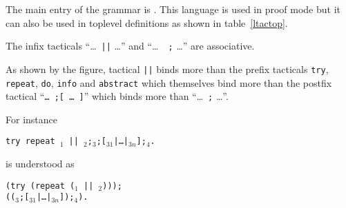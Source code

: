 The main entry of the grammar is {\tacexpr}. This language is used in
proof mode but it can also be used in toplevel definitions as shown in
table~\ref{ltactop}.
\begin{Remarks}
\item The infix tacticals ``\dots\ {\tt ||} \dots'' and ``\dots\ {\tt
    ;} \dots'' are associative. 

\item As shown by the figure, tactical {\tt ||} binds more than the
prefix tacticals {\tt try}, {\tt repeat}, {\tt do}, {\tt info} and
{\tt abstract} which themselves bind more than the postfix tactical
``{\tt \dots\ ;[ \dots\ ]}'' which binds more than ``\dots\ {\tt ;}
\dots''.

For instance
\begin{tabbing}
{\tt try repeat \tac$_1$ ||
  \tac$_2$;\tac$_3$;[\tac$_{31}$|\dots|\tac$_{3n}$];\tac$_4$.}
\end{tabbing}
is understood as 
\begin{tabbing}
{\tt (try (repeat (\tac$_1$ || \tac$_2$)));} \\
{\tt ((\tac$_3$;[\tac$_{31}$|\dots|\tac$_{3n}$]);\tac$_4$).}
\end{tabbing}
\end{Remarks}


